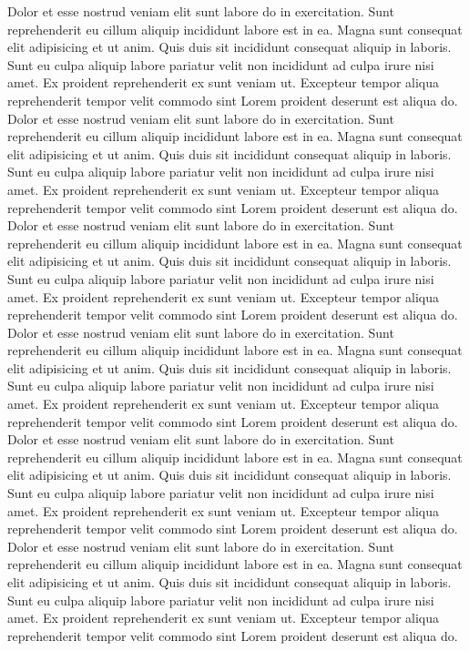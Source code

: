 \documentclass[12pt, twoside]{article}
\begin{document}
Dolor et esse nostrud veniam elit sunt labore do in exercitation. Sunt reprehenderit eu cillum aliquip incididunt labore est in ea. Magna sunt consequat elit adipisicing et ut anim. Quis duis sit incididunt consequat aliquip in laboris. Sunt eu culpa aliquip labore pariatur velit non incididunt ad culpa irure nisi amet. Ex proident reprehenderit ex sunt veniam ut. Excepteur tempor aliqua reprehenderit tempor velit commodo sint Lorem proident deserunt est aliqua do.
Dolor et esse nostrud veniam elit sunt labore do in exercitation. Sunt reprehenderit eu cillum aliquip incididunt labore est in ea. Magna sunt consequat elit adipisicing et ut anim. Quis duis sit incididunt consequat aliquip in laboris. Sunt eu culpa aliquip labore pariatur velit non incididunt ad culpa irure nisi amet. Ex proident reprehenderit ex sunt veniam ut. Excepteur tempor aliqua reprehenderit tempor velit commodo sint Lorem proident deserunt est aliqua do.
Dolor et esse nostrud veniam elit sunt labore do in exercitation. Sunt reprehenderit eu cillum aliquip incididunt labore est in ea. Magna sunt consequat elit adipisicing et ut anim. Quis duis sit incididunt consequat aliquip in laboris. Sunt eu culpa aliquip labore pariatur velit non incididunt ad culpa irure nisi amet. Ex proident reprehenderit ex sunt veniam ut. Excepteur tempor aliqua reprehenderit tempor velit commodo sint Lorem proident deserunt est aliqua do.
Dolor et esse nostrud veniam elit sunt labore do in exercitation. Sunt reprehenderit eu cillum aliquip incididunt labore est in ea. Magna sunt consequat elit adipisicing et ut anim. Quis duis sit incididunt consequat aliquip in laboris. Sunt eu culpa aliquip labore pariatur velit non incididunt ad culpa irure nisi amet. Ex proident reprehenderit ex sunt veniam ut. Excepteur tempor aliqua reprehenderit tempor velit commodo sint Lorem proident deserunt est aliqua do.
Dolor et esse nostrud veniam elit sunt labore do in exercitation. Sunt reprehenderit eu cillum aliquip incididunt labore est in ea. Magna sunt consequat elit adipisicing et ut anim. Quis duis sit incididunt consequat aliquip in laboris. Sunt eu culpa aliquip labore pariatur velit non incididunt ad culpa irure nisi amet. Ex proident reprehenderit ex sunt veniam ut. Excepteur tempor aliqua reprehenderit tempor velit commodo sint Lorem proident deserunt est aliqua do.
Dolor et esse nostrud veniam elit sunt labore do in exercitation. Sunt reprehenderit eu cillum aliquip incididunt labore est in ea. Magna sunt consequat elit adipisicing et ut anim. Quis duis sit incididunt consequat aliquip in laboris. Sunt eu culpa aliquip labore pariatur velit non incididunt ad culpa irure nisi amet. Ex proident reprehenderit ex sunt veniam ut. Excepteur tempor aliqua reprehenderit tempor velit commodo sint Lorem proident deserunt est aliqua do.
\end{document}
